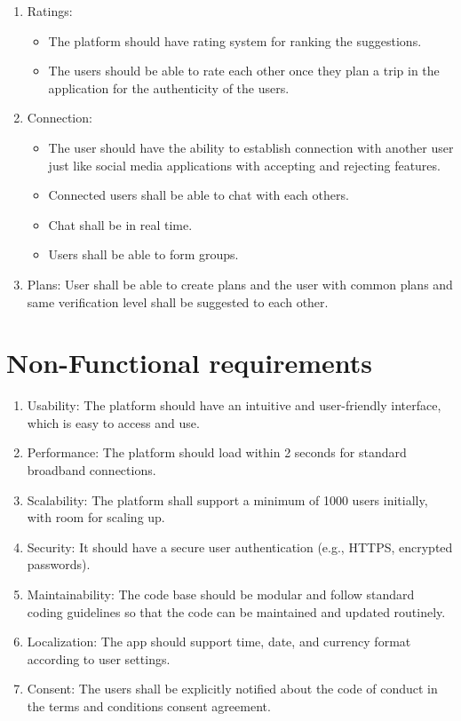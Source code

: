 \documentclass[12pt,a4paper]{report}
\begin{document}
\begin{enumerate}
    \item Ratings:
    \begin{itemize}
        \item The platform should have rating system for ranking the suggestions.
        \item The users should be able to rate each other once they plan a trip in the application for the authenticity of the users.
    \end{itemize}

    \item Connection:
    \begin{itemize}
        \item The user should have the ability to establish connection with another user just like social media applications with accepting and rejecting features.
        \item Connected users shall be able to chat with each others.
        \item Chat shall be in real time.
        \item Users shall be able to form groups.
    \end{itemize}
    \item Plans: User shall be able to create plans and the user with common plans and same verification level shall be suggested to each other.
\end{enumerate}


\section{Non-Functional requirements}
\begin{enumerate}
    \item Usability: The platform should have an intuitive and user-friendly interface, which is easy to access and use.
    \item Performance: The platform should load within 2 seconds for standard broadband connections.
    \item Scalability: The platform shall support a minimum of 1000 users initially, with room for scaling up.
    \item Security: It should have a secure user authentication (e.g., HTTPS, encrypted passwords).
    \item Maintainability: The code base should be modular and follow standard coding guidelines so that the code can be maintained and updated routinely.
    \item Localization: The app should support time, date, and currency format according to user settings.
    \item Consent: The users shall be explicitly notified about the code of conduct in the terms and conditions consent agreement.
\end{enumerate}
\end{document}
